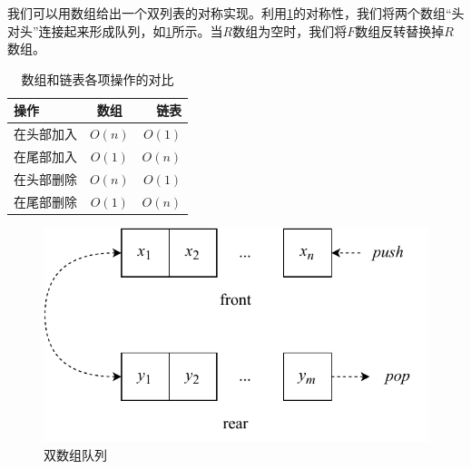 \documentclass[b5paper]{ctexart}
\begin{document}
我们可以用数组给出一个双列表的对称实现。利用\cref{tab:array-list-comp}的对称性，我们将两个数组“头对头”连接起来形成队列，如\cref{fig:horseshoe-array}所示。当$R$数组为空时，我们将$F$数组反转替换掉$R$数组。

\begin{table}[htbp]
\centering
\begin{tabular}{l | c | r}
  \hline
  操作 & 数组 & 链表 \\
  \hline
  在头部加入 & $O(n)$ & $O(1)$ \\
  在尾部加入 & $O(1)$ & $O(n)$ \\
  在头部删除 & $O(n)$ & $O(1)$ \\
  在尾部删除 & $O(1)$ & $O(n)$ \\
  \hline
\end{tabular}
\caption{数组和链表各项操作的对比} \label{tab:array-list-comp}
\end{table}

\begin{figure}[htbp]
  \centering
  \includegraphics[scale=0.6]{img/paired-arrayq}
  \caption{双数组队列}
  \label{fig:horseshoe-array}
\end{figure}

\begin{Exercise}\label{ex:paired-list-queue}
\end{Exercise}
\end{document}
